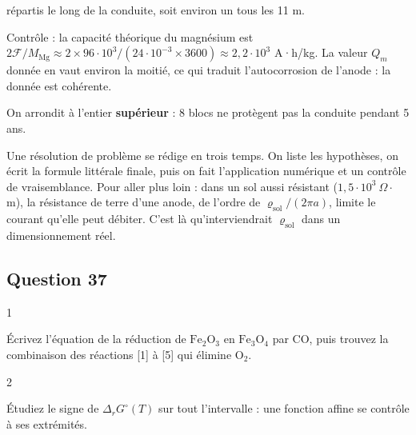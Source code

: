 \documentclass[11pt,a4paper]{article}
\renewcommand{\geq}{\geqslant}
\newcommand{\equationajustee}[1]{%
  \sbox{\boiteequation}{$\displaystyle #1$}%
  \ifdim\wd\boiteequation>\linewidth
    \[\resizebox{\linewidth}{!}{\usebox{\boiteequation}}\]%
  \else
    \[#1\]%
  \fi}
\begin{document}
\equationajustee{\begin{aligned}
n&\geq\frac{j\pi D\ell\,\Delta t}{m_{\text{el}}Q_m}\\
&\approx8{,}3.
\end{aligned}}

\equationajustee{\boxed{n=9\ \text{blocs}}}

répartis le long de la conduite, soit environ un tous les 11 m.

Contrôle : la capacité théorique du magnésium est \(2\mathcal F/M_{\mathrm{Mg}}\approx2\times96\cdot10^3/(24\cdot10^{-3}\times3600)\approx2{,}2\cdot10^3\) A·h/kg. La valeur \(Q_m\) donnée en vaut environ la moitié, ce qui traduit l'autocorrosion de l'anode : la donnée est cohérente.

\begin{piege}

On arrondit à l'entier \textbf{supérieur} : 8 blocs ne protègent pas la conduite pendant 5 ans.

\end{piege}

\begin{methode}

Une résolution de problème se rédige en trois temps. On liste les hypothèses, on écrit la formule littérale finale, puis on fait l'application numérique et un contrôle de vraisemblance. Pour aller plus loin : dans un sol aussi résistant (\(1{,}5\cdot10^3\ \Omega\cdot\)m), la résistance de terre d'une anode, de l'ordre de \(\varrho_{\text{sol}}/(2\pi a)\), limite le courant qu'elle peut débiter. C'est là qu'interviendrait \(\varrho_{\text{sol}}\) dans un dimensionnement réel.

\end{methode}

\hypertarget{question-37}{%
\subsection{Question 37}\label{question-37}}

\begin{indication}{1}

Écrivez l'équation de la réduction de \(\mathrm{Fe_2O_3}\) en \(\mathrm{Fe_3O_4}\) par CO, puis trouvez la combinaison des réactions {[}1{]} à {[}5{]} qui élimine \(\mathrm{O_2}\).

\end{indication}

\begin{indication}{2}

Étudiez le signe de \(\Delta_rG^\circ(T)\) sur tout l'intervalle : une fonction affine se contrôle à ses extrémités.

\end{indication}
\end{document}
